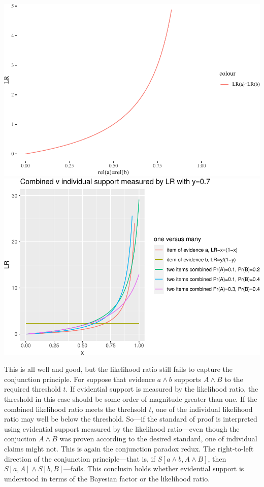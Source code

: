 \documentclass[10pt,dvipsnames,enabledeprecatedfontcommands]{scrartcl}
\newcommand{\et}{\wedge}
\begin{document}
\includegraphics{burden-proof2_files/figure-latex/unnamed-chunk-1-1.pdf}
\includegraphics{burden-proof2_files/figure-latex/unnamed-chunk-2-1.pdf}

This is all well and good, but the likelihood ratio still fails to
capture the conjunction principle. For suppose that evidence \(a \et b\)
supports \(A \et B\) to the required threshold \(t\). If evidential
support is measured by the likelihood ratio, the threshold in this case
should be some order of magnitude greater than one. If the combined
likelihood ratio meets the threhsold \(t\), one of the individual
likelihood ratio may well be below the threshold. So---if the standard
of proof is interpreted using evidential support measured by the
likelihood ratio---even though the conjuction \(A \et B\) was proven
according to the desired standard, one of individual claims might not.
This is again the conjunction paradox redux. The right-to-left direction
of the conjunction principle---that is, if \(S[a \et b, A \et B]\), then
\(S[a, A] \et S[b, B]\)---fails. This conclusin holds whether evidential
support is understood in terms of the Bayesian factor or the likelihood
ratio.
\end{document}
